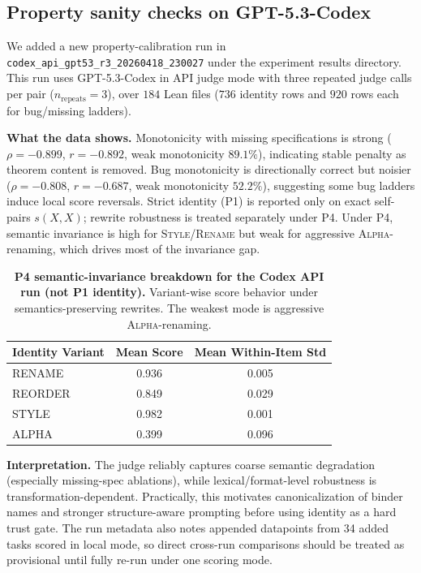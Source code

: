 \documentclass{article}
\begin{document}
\subsection{Property sanity checks on GPT-5.3-Codex}
We added a new property-calibration run in
\texttt{codex\_api\_gpt53\_r3\_20260418\_230027} under the experiment results directory.
This run uses GPT-5.3-Codex in API judge mode with three repeated judge calls per pair (\(n_\text{repeats}=3\)), over \(184\) Lean files (\(736\) identity rows and \(920\) rows each for bug/missing ladders).

\textbf{What the data shows.}
Monotonicity with missing specifications is strong (\(\rho=-0.899\), \(r=-0.892\), weak monotonicity \(89.1\%\)), indicating stable penalty as theorem content is removed.
Bug monotonicity is directionally correct but noisier (\(\rho=-0.808\), \(r=-0.687\), weak monotonicity \(52.2\%\)), suggesting some bug ladders induce local score reversals.
Strict identity (P1) is reported only on exact self-pairs \(s(X,X)\); rewrite robustness is treated separately under P4.
Under P4, semantic invariance is high for \textsc{Style}/\textsc{Rename} but weak for aggressive \textsc{Alpha}-renaming, which drives most of the invariance gap.

\begin{table}[t]
  \centering
  \small
  \begin{tabular}{lcc}
    \toprule
    \textbf{Identity Variant} & \textbf{Mean Score} & \textbf{Mean Within-Item Std} \\
    \midrule
    RENAME                    & 0.936               & 0.005                         \\
    REORDER                   & 0.849               & 0.029                         \\
    STYLE                     & 0.982               & 0.001                         \\
    ALPHA                     & 0.399               & 0.096                         \\
    \bottomrule
  \end{tabular}
  \caption{\textbf{P4 semantic-invariance breakdown for the Codex API run (not P1 identity).}
    Variant-wise score behavior under semantics-preserving rewrites. The weakest mode is aggressive \textsc{Alpha}-renaming.}
  \label{tab:codex_invariance_variants}
\end{table}

\textbf{Interpretation.}
The judge reliably captures coarse semantic degradation (especially missing-spec ablations), while lexical/format-level robustness is transformation-dependent.
Practically, this motivates canonicalization of binder names and stronger structure-aware prompting before using identity as a hard trust gate.
The run metadata also notes appended datapoints from 34 added tasks scored in local mode, so direct cross-run comparisons should be treated as provisional until fully re-run under one scoring mode.
\end{document}
